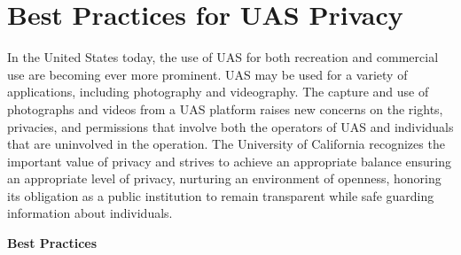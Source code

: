 \documentclass[
]{book}
\begin{document}
\hypertarget{ch-privacy}{%
\chapter{Best Practices for UAS Privacy}\label{ch-privacy}}

In the United States today, the use of UAS for both recreation and commercial use are becoming ever more prominent. UAS may be used for a variety of applications, including photography and videography. The capture and use of photographs and videos from a UAS platform raises new concerns on the rights, privacies, and permissions that involve both the operators of UAS and individuals that are uninvolved in the operation. The University of California recognizes the important value of privacy and strives to achieve an appropriate balance ensuring an appropriate level of privacy, nurturing an environment of openness, honoring its obligation as a public institution to remain transparent while safe guarding information about individuals.

\textbf{Best Practices}
\end{document}
